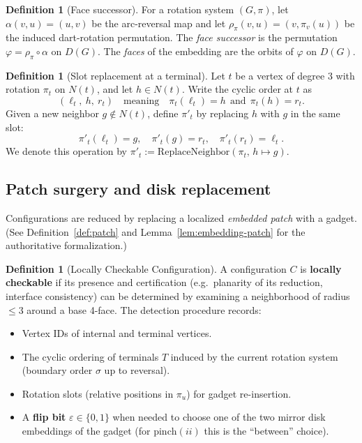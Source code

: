 \documentclass[12pt]{article}
\theoremstyle{definition}
\newtheorem{definition}[theorem]{Definition}
\begin{document}
\begin{definition}[Face successor]\label{def:face-successor}
For a rotation system $(G,\pi)$, let $\alpha(v,u)=(u,v)$ be the arc-reversal map and let $\rho_\pi(v,u)=(v,\pi_v(u))$ be the induced dart-rotation permutation.
The \emph{face successor} is the permutation $\varphi = \rho_\pi \circ \alpha$ on $D(G)$. The \emph{faces} of the embedding are the orbits of $\varphi$ on $D(G)$.
\end{definition}

\begin{definition}[Slot replacement at a terminal]\label{def:replace-neighbor}
Let $t$ be a vertex of degree $3$ with rotation $\pi_t$ on $N(t)$, and let $h\in N(t)$.
Write the cyclic order at $t$ as
\[
(\ell_t,\ h,\ r_t)
\quad\text{meaning}\quad
\pi_t(\ell_t)=h\ \ \text{and}\ \ \pi_t(h)=r_t .
\]
Given a new neighbor $g\notin N(t)$, define $\pi'_t$ by replacing $h$ with $g$ in the same slot:
\[
\pi'_t(\ell_t)=g,\quad \pi'_t(g)=r_t,\quad \pi'_t(r_t)=\ell_t .
\]
We denote this operation by $\pi'_t:=\mathrm{ReplaceNeighbor}(\pi_t,\,h\mapsto g)$.
\end{definition}

\subsection{Patch surgery and disk replacement}
\label{subsec:patch-surgery}

Configurations are reduced by replacing a localized \emph{embedded patch} with a gadget.
(See Definition~\ref{def:patch} and Lemma~\ref{lem:embedding-patch} for the authoritative formalization.)

\begin{definition}[Locally Checkable Configuration] \label{def:config-detection}
A configuration $C$ is \textbf{locally checkable} if its presence and certification (e.g.\ planarity of its reduction, interface consistency) can be determined by examining a neighborhood of radius $\le 3$ around a base 4-face. The detection procedure records:
\begin{itemize}
    \item Vertex IDs of internal and terminal vertices.
    \item The cyclic ordering of terminals $T$ induced by the current rotation system (boundary order $\sigma$ up to reversal).
    \item Rotation slots (relative positions in $\pi_u$) for gadget re-insertion.
    \item A \textbf{flip bit} $\varepsilon\in\{0,1\}$ when needed to choose one of the two mirror disk embeddings of the gadget (for $\mathrm{pinch}(ii)$ this is the ``between'' choice).
\end{itemize}
\end{definition}
\end{document}
